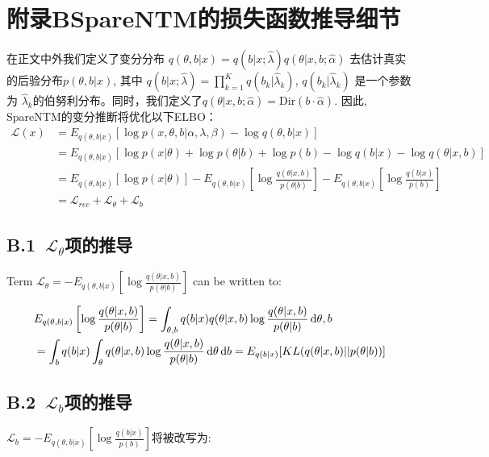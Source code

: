\chapter*{附录B\quad SpareNTM的损失函数推导细节}

在正文中外我们定义了变分分布 $q(\theta,b|x)=q(b|x;\hat{\lambda})q(\theta|x,b;\hat{\alpha})$ 去估计真实的后验分布$p(\theta,b|x)$, 其中 $q(b|x;\hat{\lambda})=\prod_{k=1}^{K}q(b_k|\hat{\lambda}_k)$, $q(b_k|\hat{\lambda}_k)$ 是一个参数为 $\hat{\lambda}_k$的伯努利分布。同时，我们定义了$q(\theta|x,b;\hat{\alpha})=\mbox{Dir}(b\cdot\hat{\alpha})$. 因此, SpareNTM的变分推断将优化以下ELBO：
\begin{align}
	\mathcal{L}(x)&=E_{q(\theta,b|x)}\left[\log p(x,\theta,b|\alpha,\lambda,\beta) - \log q(\theta,b|x)\right]\\
        &=E_{q(\theta,b|x)}\left[\log p(x|\theta)+\log p(\theta|b)+\log p(b)-\log q(b|x)-\log q(\theta|x,b)\right]\nonumber\\
	&=E_{q(\theta,b|x)}\left[\log p(x|\theta)\right]-E_{q(\theta,b|x)}\left[\log\frac{q(\theta|x,b)}{p(\theta|b)}\right]-E_{q(\theta,b|x)}\left[\log\frac{q(b|x)}{p(b)}\right]\nonumber\\
        &=\mathcal{L}_{rec}+\mathcal{L}_\theta+\mathcal{L}_b\nonumber
\end{align}

\section*{B.1\ $\mathcal{L}_\theta$项的推导}
Term $\mathcal{L}_\theta=-E_{q(\theta,b|x)}\left[\log\frac{q(\theta|x,b)}{p(\theta|b)}\right]$ can be written to:

\begin{equation}
\begin{aligned}
&E_{q(\theta,b|x)}\left[\log\frac{q(\theta|x,b)}{p(\theta|b)}\right]=\int_{\theta,b}q(b|x)q(\theta|x,b)\log \frac{q(\theta|x,b)}{p(\theta|b)}\mathop{}\!\mathrm{d}\theta,b\\
&=\int_{b}q(b|x)\int_{\theta}q(\theta|x,b)\log \frac{q(\theta|x,b)}{p(\theta|b)}\mathop{}\!\mathrm{d}\theta\mathop{}\!\mathrm{d} b=E_{q(b|x)}[KL(q(\theta|x,b)||p(\theta|b))]
\end{aligned}
\end{equation}

\section*{B.2\ $\mathcal{L}_b$项的推导}
$\mathcal{L}_b=-E_{q(\theta,b|x)}\left[\log\frac{q(b|x)}{p(b)}\right]$将被改写为:

